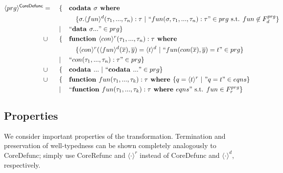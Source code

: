 \begin{algorithm}

\begin{align*}
\langle prg \rangle^{\textsf{CoreDefunc}} & = ~&& \{ && \textrm{\textbf{codata }} \sigma \textrm{\textbf{ where }} \span\span\span\span \\
& && && && \{ \sigma.\langle fun \rangle^d (\tau_1, ..., \tau_n): \tau ~ | ~ `` fun(\sigma, \tau_1, ..., \tau_n): \tau " \in prg \text{ s.t. } fun \not\in F^{prg}_d \} \\
& && | && `` \textrm{\textbf{data }} \sigma ... " \in prg \} \span\span\span\span \\
& \cup && \{ && \textrm{\textbf{function }} \langle con \rangle^r (\tau_1, ..., \tau_n): \tau \textrm{\textbf{ where}} \span\span\span\span \\
& && && && \{ \langle con \rangle^r (\langle fun \rangle^d (\overline{x}), \overline{y}) = \langle t \rangle^d ~ | ~ `` fun(con(\overline{x}), \overline{y}) = t " \in prg \} \\
& && | && `` con(\tau_1, ..., \tau_n): \tau " \in prg \} \span\span\span\span \\
& \cup && \{ && \textrm{\textbf{codata }} ... ~ | ~ `` \textrm{\textbf{codata }} ... " \in prg \} \span\span\span\span \\
& \cup && \{ && \textrm{\textbf{function }} fun(\tau_1, ..., \tau_k): \tau \textrm{\textbf{ where }} \{ q = \langle t \rangle^r ~ | ~ "q = t" \in eqns \} \span\span\span\span \\
& && | && `` \textrm{\textbf{function }} fun(\tau_1, ..., \tau_k): \tau \textrm{\textbf{ where }} eqns " \text{ s.t. } fun \in F^{prg}_r \} \span\span\span\span
\end{align*}

\end{algorithm}

\subsection{Properties}

We consider important properties of the transformation. Termination and preservation of well-typedness can be shown completely analogously to \textsf{CoreDefunc}; simply use \textsf{CoreRefunc} and $\langle \cdot \rangle^r$ instead of \textsf{CoreDefunc} and $\langle \cdot \rangle^d$, respectively.

